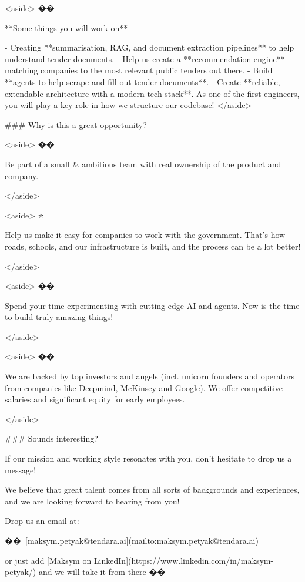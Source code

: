 <aside>
��️

**Some things you will work on**

- Creating **summarisation, RAG, and document extraction pipelines** to help understand tender documents.
- Help us create a **recommendation engine** matching companies to the most relevant public tenders out there.
- Build **agents to help scrape and  fill-out tender documents**.
- Create **reliable, extendable architecture with a modern tech stack**. As one of the first engineers, you will play a key role in how we structure our codebase!
</aside>

### Why is this a great opportunity?

<aside>
��

Be part of a small & ambitious team with real ownership of the product and company.

</aside>

<aside>
⭐

Help us make it easy for companies to work with the government. That’s how roads, schools, and our infrastructure is built, and the process can be a lot better!

</aside>

<aside>
��

Spend your time experimenting with cutting-edge AI and agents. Now is the time to build truly amazing things!

</aside>

<aside>
��

We are backed by top investors and angels (incl. unicorn founders and operators from companies like Deepmind, McKinsey and Google). We offer competitive salaries and significant equity for early employees.

</aside>

### Sounds interesting?

If our mission and working style resonates with you, don’t hesitate to drop us a message!

We believe that great talent comes from all sorts of backgrounds and experiences, and we are looking forward to hearing from you!

Drop us an email at:

�� [maksym.petyak@tendara.ai](mailto:maksym.petyak@tendara.ai) 

or just add [Maksym on LinkedIn](https://www.linkedin.com/in/maksym-petyak/) and we will take it from there ��